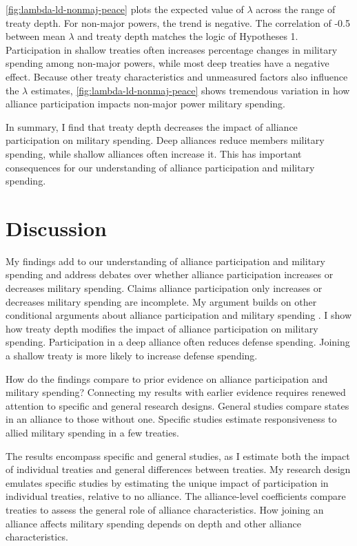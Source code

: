 \documentclass[12pt]{article}
\begin{document}
\autoref{fig:lambda-ld-nonmaj-peace} plots the expected value of $\lambda$ across the range of treaty depth. 
For non-major powers, the trend is negative.
The correlation of -0.5 between mean $\lambda$ and treaty depth matches the logic of Hypotheses 1. 
Participation in shallow treaties often increases percentage changes in military spending among non-major powers, while most deep treaties have a negative effect. 
Because other treaty characteristics and unmeasured factors also influence the $\lambda$ estimates, \autoref{fig:lambda-ld-nonmaj-peace} shows tremendous variation in how alliance participation impacts non-major power military spending. 


In summary, I find that treaty depth decreases the impact of alliance participation on military spending. 
Deep alliances reduce members military spending, while shallow alliances often increase it. 
This has important consequences for our understanding of alliance participation and military spending. 



\section{Discussion}


My findings add to our understanding of alliance participation and military spending and address debates over whether alliance participation increases or decreases military spending. 
Claims alliance participation only increases or decreases military spending are incomplete. 
My argument builds on other conditional arguments about alliance participation and military spending \citep{DigiuseppePoast2016}. 
I show how treaty depth modifies the impact of alliance participation on military spending. 
Participation in a deep alliance often reduces defense spending. 
Joining a shallow treaty is more likely to increase defense spending. 


How do the findings compare to prior evidence on alliance participation and military spending? 
Connecting my results with earlier evidence requires renewed attention to specific and general research designs. 
General studies compare states in an alliance to those without one. 
Specific studies estimate responsiveness to allied military spending in a few treaties. 


The results encompass specific and general studies, as I estimate both the impact of individual treaties and general differences between treaties. 
My research design emulates specific studies by estimating the unique impact of participation in individual treaties, relative to no alliance. 
The alliance-level coefficients compare treaties to assess the general role of alliance characteristics.   
How joining an alliance affects military spending depends on depth and other alliance characteristics. 
\end{document}
